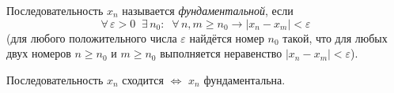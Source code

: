 \begin{defn} \label{df2:17}
Последовательность $x_n$ называется \textit{фундаментальной}, если
$$
\forall\, \varepsilon > 0 \;\; \exists\, n_0 \colon \;\; \forall\, n, m \ge n_0 \longrightarrow |x_n - x_m| < \varepsilon
$$
(для любого положительного числа $\varepsilon$ найдётся номер $n_0$ такой, что для любых двух номеров $n \ge n_0$ и $m \ge n_0$ выполняется неравенство $|x_n - x_m| < \varepsilon$).
\end{defn}


\begin{thm} \label{th2:13}
Последовательность $x_n$ сходится $\iff$ $x_n$ фундаментальна.
\end{thm}

